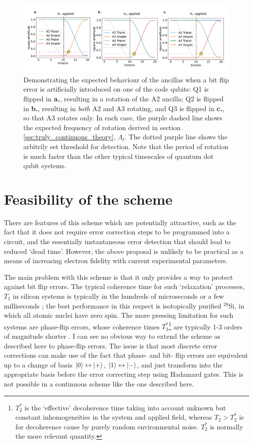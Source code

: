 \documentclass{report}
\begin{document}
\begin{figure}[h]
    \centering
    \includegraphics[scale = 0.87]{Figures/flips.pdf}
    \caption{Demonstrating the expected behaviour of the ancillas when a bit flip error is artificially introduced on one of the code qubits: Q1 is flipped in \textbf{a.}, resulting in a rotation of the A2 ancilla; Q2 is flipped in \textbf{b.}, resulting in \textit{both} A2 and A3 rotating, and Q3 is flipped in \textbf{c.}, so that A3 rotates only. In each case, the purple dashed line shows the expected frequency of rotation derived in section \ref{sec:truly_continuous_theory}, $\Lambda_t$. The dotted purple line shows the arbitrily set threshold for detection. Note that the period of rotation is much faster than the other typical timescales of quantum dot qubit systems.
    }\label{fig:afterflip}
\end{figure}


\chapter {Feasibility of the scheme}
There are features of this scheme which are potentially attractive, such as the fact that it does not require error correction steps to be programmed into a circuit, and the essentially instantaneous error detection that should lead to reduced `dead time'. However, the above proposal is unlikely to be practical as a means of increasing electron fidelity with current experimental parameters. 

The main problem with this scheme is that it only provides a way to protect against bit flip errors. The typical coherence time for such `relaxation' processes, $T_1$ in silicon systems is typically in the hundreds of microseconds or a few milliseconds \cite{Loss2021}\cite{Zwerver2022}; the best performance in this respect is isotopically purified $^{28}$Si, in which all atomic nuclei have zero spin. The more pressing limitation for such systems are phase-flip errors, whose coherence times $T_2^*$\footnote{$T_2^*$ is the `effective' decoherence time taking into account unknown but constant inhomogeneities in the system and applied field, whereas $T_2 > T_2^*$ is for decoherence cause by purely random environmental noise. $T_2^*$ is normally the more relevant quantity.} are typically 1-3 orders of magnitude shorter \cite{Loss2021}. I can see no obvious way to extend the scheme as described here to phase-flip errors. The issue is that most discrete error corrections can make use of the fact that phase- and bit- flip errors are equivalent up to a change of basis $\ket{0} \leftrightarrow \ket{+}$, $\ket{1}\leftrightarrow\ket{-}$, and just transform into the appropriate basis before the error correcting step using Hadamard gates. This is not possible in a continuous scheme like the one described here.
\end{document}
